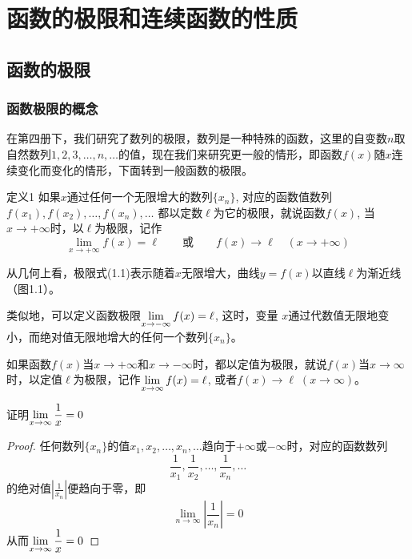 \chapter{函数的极限和连续函数的性质}

\section{函数的极限}
\subsection{函数极限的概念}

在第四册下，我们研究了数列的极限，数列是一种特殊的函数，这里的自变数$n$取自然数列$1, 2, 3,\ldots,n,\ldots$的值，现在我们来研究更一般的情形，即函数$f(x)$随$x$连续变化而变化的情形，下面转到一般函数的极限。

\begin{blk}{定义1}
    如果$x$通过任何一个无限增大的数列$\{x_n\}$, 对应的函数值数列
$f (x_1 ) ,f (x_2) , \ldots,f (x_n ) ,\ldots$
都以定数$\ell$为它的极限，就说函数$f(x)$, 当$x\to +\infty$时，以$\ell$为极限，记作
\begin{equation}
    \lim_{x\to+\infty}f(x)=\ell\qquad \text{或}\qquad f(x)\to \ell\quad (x\to +\infty)
\end{equation}
\end{blk}
 
从几何上看，极限式(1.1)表示随着$x$无限增大，曲线$y=f(x)$以直线$\ell$为渐近线（图1.1）。
\begin{figure}[htp]
    \centering
    
    \caption{}
\end{figure}

类似地，可以定义函数极限$\displaystyle\lim_{x\to -\infty} f(x)=\ell$, 这时，变量
$x$通过代数值无限地变小，而绝对值无限地增大的任何一个数列$\{x_n\}$。

如果函数$f(x)$当$x\to+\infty$和$x\to-\infty$时，都以定值为极限，就说$f(x)$当$x\to \infty$时，以定值$\ell$为极限，记作$\displaystyle\lim_{x\to\infty}f(x)=\ell$, 或者$f(x)\to \ell\; (x\to\infty)$。

\begin{example}
    证明$\displaystyle\lim_{x\to\infty}\dfrac{1}{x}=0$
\end{example}

\begin{proof}
任何数列$\{x_n\}$的值$x_1,x_2,\ldots,x_n,\ldots$趋向于$+\infty$或$-\infty$时，对应的函数数列
\[\frac{1}{x_1},\frac{1}{x_2},\ldots, \frac{1}{x_n},\ldots\]
的绝对值$\left|\frac{1}{x_n}\right|$便趋向于零，即
    \[\lim_{n\to\infty}\left|\frac{1}{x_n}\right|=0\]
    从而$\displaystyle\lim_{x\to\infty}\dfrac{1}{x}=0$
\end{proof}

